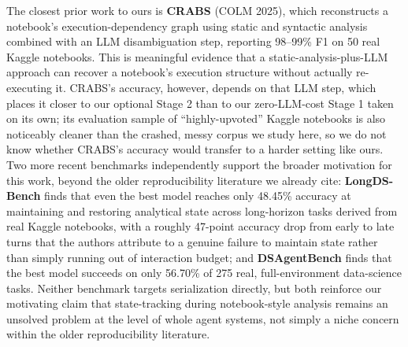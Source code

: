 \documentclass[11pt]{article}
\begin{document}
The closest prior work to ours is \textbf{CRABS} \citep{li2025crabs}
(COLM 2025), which reconstructs a notebook's execution-dependency graph
using static and syntactic analysis combined with an LLM disambiguation
step, reporting 98--99\% F1 on 50 real Kaggle notebooks. This is
meaningful evidence that a static-analysis-plus-LLM approach can recover
a notebook's execution structure without actually re-executing it.
CRABS's accuracy, however, depends on that LLM step, which places it
closer to our optional Stage 2 than to our zero-LLM-cost Stage 1 taken on
its own; its evaluation sample of ``highly-upvoted'' Kaggle notebooks is
also noticeably cleaner than the crashed, messy corpus we study here, so
we do not know whether CRABS's accuracy would transfer to a harder
setting like ours. Two more recent benchmarks independently support the
broader motivation for this work, beyond the older reproducibility
literature we already cite: \textbf{LongDS-Bench} \citep{xu2026longds}
finds that even the best model reaches only 48.45\% accuracy at
maintaining and restoring analytical state across long-horizon tasks
derived from real Kaggle notebooks, with a roughly 47-point accuracy drop
from early to late turns that the authors attribute to a genuine failure
to maintain state rather than simply running out of interaction budget;
and \textbf{DSAgentBench} \citep{rahman2026dsagentbench} finds that the
best model succeeds on only 56.70\% of 275 real, full-environment
data-science tasks. Neither benchmark targets serialization directly, but
both reinforce our motivating claim that state-tracking during
notebook-style analysis remains an unsolved problem at the level of
whole agent systems, not simply a niche concern within the older
reproducibility literature.
\end{document}
